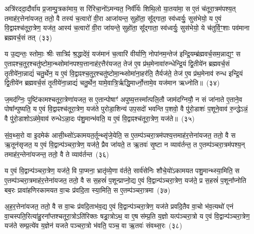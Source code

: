 {\anuvakamend[{लो॒कान्ग॑मयति॒ सावि॑द्वान्थ्सु॒शेवा॒ मावि॑श॒ यज॑मानं॒ द्वाद॑श च}]}%

अत्रि॑रददा॒दौर्वा॑य प्र॒जाम्पु॒त्रका॑माय॒ स रि॑रिचा॒नो॑\-ऽमन्यत॒ निर्वी᳚र्यः शिथि॒लो या॒तया॑मा॒ स ए॒तं च॑तूरा॒त्रम॑पश्य॒त् तमाह॑र॒त्तेना॑यजत॒ ततो॒ वै तस्य॑ च॒त्वारो॑ वी॒रा आजा॑यन्त॒ सुहो॑ता॒ सू᳚द्गाता॒ स्व॑ध्वर्युः॒ सुस॑भेयो॒ य ए॒वं वि॒द्वाꣴश्च॑तूरा॒त्रेण॒ यज॑त॒ आस्य॑ च॒त्वारो॑ वी॒रा जा॑यन्ते॒ सुहो॑ता॒ सू᳚द्गाता॒ स्व॑ध्वर्युः॒ सुस॑भेयो॒ ये च॑तुर्वि॒ꣳ॒शाः पव॑माना ब्रह्मवर्च॒सं तत्~(३३)

य उ॒द्यन्तः॒ स्तोमाः॒ श्रीः सात्रिꣴ॑ श्र॒द्धादे॑वं॒ यज॑मानं च॒त्वारि॑ वीर्याणि॒ नोपा॑नम॒न्तेज॑ इन्द्रि॒यम्ब्र॑ह्मवर्च॒सम॒न्नाद्य॒ꣳ॒ स ए॒ताꣴश्च॒तुर॒श्चतु॑ष्टोमा॒न्थ्सोमा॑नपश्य॒त्तानाह॑र॒त्तैर॑यजत॒ तेज॑ ए॒व प्र॑थ॒मेनावा॑रुन्धेन्द्रि॒यं द्वि॒तीये॑न ब्रह्मवर्च॒सं तृ॒तीये॑ना॒न्नाद्यं॑ चतु॒र्थेन॒ य ए॒वं वि॒द्वाꣴश्च॒तुर॒श्चतु॑ष्टोमा॒न्थ्सोमा॑ना॒हर॑ति॒ तैर्यज॑ते॒ तेज॑ ए॒व प्र॑थ॒मेनाव॑ रुन्ध इन्द्रि॒यं द्वि॒तीये॑न ब्रह्मवर्च॒सं तृ॒तीये॑ना॒न्नाद्यं॑ चतु॒र्थेन॒ यामे॒वात्रि॒र्\mbox{}ऋद्धि॒मार्ध्नो॒त्तामे॒व यज॑मान ऋध्नोति॥~(३४)

{\anuvakamend[{तत्तेज॑ ए॒वाष्टाद॑श च}]}%

ज॒मद॑ग्निः॒ पुष्टि॑कामश्चतूरा॒त्रेणा॑यजत॒ स ए॒तान्पोषाꣳ॑ अपुष्य॒त्तस्मा᳚त्पलि॒तौ जाम॑दग्नियौ॒ न सं जा॑नाते ए॒ताने॒व पोषा᳚न्पुष्यति॒ य ए॒वं वि॒द्वाꣴश्च॑तूरा॒त्रेण॒ यज॑ते पुरोडा॒शिन्य॑ उप॒सदो॑ भवन्ति प॒शवो॒ वै पु॑रो॒डाशः॑ प॒शूने॒वाव॑ रु॒न्द्धे\-ऽन्नं॒ वै पु॑रो॒डाशो\-ऽन्न॑मे॒वाव॑ रुन्धे\-ऽन्ना॒दः प॑शु॒मान्भ॑वति॒ य ए॒वं वि॒द्वाꣴश्च॑तूरा॒त्रेण॒ यज॑ते॥~(३५)

{\anuvakamend[{ज॒मद॑ग्निर॒ष्टाच॑त्वारिꣳशत्}]}%

सं॒व॒थ्स॒रो वा इ॒दमेक॑ आसी॒थ्सो॑\-ऽकामयत॒र्तून्थ्सृ॑जे॒येति॒ स ए॒तम्प॑ञ्चरा॒त्रम॑पश्य॒त्तमाह॑र॒त्तेना॑यजत॒ ततो॒ वै स ऋ॒तून॑सृजत॒ य ए॒वं वि॒द्वान्प॑ञ्चरा॒त्रेण॒ यज॑ते॒ प्रैव जा॑यते॒ त ऋ॒तवः॑ सृ॒ष्टा न व्याव॑र्तन्त॒ त ए॒तम्प॑ञ्चरा॒त्रम॑पश्य॒न् तमाह॑र॒न्तेना॑यजन्त॒ ततो॒ वै ते व्याव॑र्तन्त~(३६)

य ए॒वं वि॒द्वान्प॑ञ्चरा॒त्रेण॒ यज॑ते॒ वि पा॒प्मना॒ भ्रातृ॑व्ये॒णा व॑र्तते॒ सार्व॑सेनिः शौचे॒यो॑\-ऽकामयत पशु॒मान्थ्स्या॒मिति॒ स ए॒तम्प॑ञ्चरा॒त्रमाह॑र॒त्तेना॑यजत॒ ततो॒ वै स स॒हस्रं॑ प॒शून्प्राप्नो॒द्य ए॒वं वि॒द्वान्प॑ञ्चरा॒त्रेण॒ यज॑ते॒ प्र स॒हस्रं॑ प॒शूना᳚प्नोति बब॒रः प्रावा॑हणिरकामयत वा॒चः प्र॑वदि॒ता स्या॒मिति॒ स ए॒तम्प॑ञ्चरा॒त्रमा~(३७)

अ॒ह॒र॒त्तेना॑यजत॒ ततो॒ वै स वा॒चः प्र॑वदि॒ताभ॑व॒द्य ए॒वं वि॒द्वान्प॑ञ्चरा॒त्रेण॒ यज॑ते प्रवदि॒तैव वा॒चो भ॑व॒त्यथो॑ एनं वा॒चस्पति॒रित्या॑हु॒रना᳚प्तश्चतूरा॒त्रो\-ऽति॑रिक्तः षड्रा॒त्रो\-ऽथ॒ वा ए॒ष स॑म्प्र॒ति य॒ज्ञो यत्प॑ञ्चरा॒त्रो य ए॒वं वि॒द्वान्प॑ञ्चरा॒त्रेण॒ यज॑ते सम्प्र॒त्ये॑व य॒ज्ञेन॑ यजते पञ्चरा॒त्रो भ॑वति॒ पञ्च॒ वा ऋ॒तवः॑ संवथ्स॒रः~(३८)

